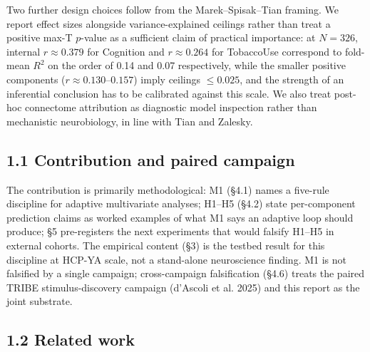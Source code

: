 \documentclass[11pt,letterpaper]{report}
\begin{document}
Two further design choices follow from the Marek--Spisak--Tian framing. We report effect sizes alongside variance-explained ceilings rather than treat a positive max-T $p$-value as a sufficient claim of practical importance: at $N = 326$, internal $r \approx 0.379$ for Cognition and $r \approx 0.264$ for TobaccoUse correspond to fold-mean $R^{2}$ on the order of 0.14 and 0.07 respectively, while the smaller positive components ($r \approx 0.130$--$0.157$) imply ceilings $\le 0.025$, and the strength of an inferential conclusion has to be calibrated against this scale. We also treat post-hoc connectome attribution as diagnostic model inspection rather than mechanistic neurobiology, in line with Tian and Zalesky.

\subsection*{1.1 Contribution and paired campaign}

The contribution is primarily methodological: M1 (\S4.1) names a five-rule discipline for adaptive multivariate analyses; H1--H5 (\S4.2) state per-component prediction claims as worked examples of what M1 says an adaptive loop should produce; \S5 pre-registers the next experiments that would falsify H1--H5 in external cohorts. The empirical content (\S3) is the testbed result for this discipline at HCP-YA scale, not a stand-alone neuroscience finding. M1 is not falsified by a single campaign; cross-campaign falsification (\S4.6) treats the paired TRIBE stimulus-discovery campaign (d'Ascoli et al. 2025) and this report as the joint substrate.

\subsection*{1.2 Related work}
\end{document}
